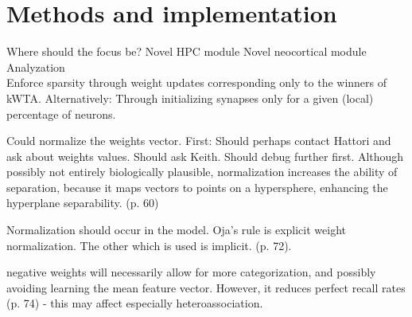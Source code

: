 
\chapter{Methods and implementation}\label{chpt:methods}
Where should the focus be?
Novel HPC module
Novel neocortical module
Analyzation
\\

Enforce sparsity through weight updates corresponding only to the winners of kWTA.
Alternatively: Through initializing synapses only for a given (local) percentage of neurons.

Could normalize the weights vector. First: Should perhaps contact Hattori and ask about weights values. Should ask Keith. Should debug further first.
Although possibly not entirely biologically plausible, normalization increases the ability of separation, because it maps vectors to points on a hypersphere, enhancing the hyperplane separability. (p. 60)

Normalization should occur in the model. Oja's rule is explicit weight normalization. The other which is used is implicit. (p. 72).

negative weights will necessarily allow for more categorization, and possibly avoiding learning the mean feature vector. However, it reduces perfect recall rates (p. 74) - this may affect especially heteroassociation.